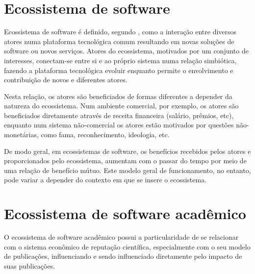 \section{Ecossistema de software}


Ecossistema de software é definido, segundo ,
como a interação entre diversos atores numa plataforma tecnológica comum
resultando em novas soluções de software ou novos serviços. 
Atores do ecossistema, motivados por um conjunto de interesses, conectam-se entre si e ao
próprio sistema numa relação simbiótica, fazendo a plataforma tecnológica
evoluir enquanto permite o envolvimento e contribuição de novos e diferentes
atores.

Nesta relação, os atores são beneficiados de formas diferentes a depender da
natureza do ecossistema. Num ambiente comercial, por exemplo, os atores são
beneficiados diretamente através de receita financeira (salário, prêmios, etc),
enquanto num sistema não-comercial os atores estão motivados por questões
não-monetárias, como fama, reconhecimento, ideologia, etc.

De modo geral, em ecossistemas de software, os benefícios recebidos pelos
atores e proporcionados pelo ecossistema, aumentam com o passar do tempo
por meio de uma relação de benefício mútuo. 
Este modelo geral de funcionamento, no entanto, pode variar 
a depender do contexto em que se insere o ecossistema.



\section{Ecossistema de software acadêmico}

O ecossistema de software acadêmico possui a particularidade de se relacionar
com o sistema econômico de reputação científica, especialmente com o seu modelo
de publicações, influenciando e sendo influenciado diretamente pelo impacto de
suas publicações.


